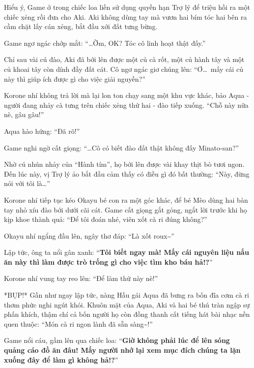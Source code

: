 \documentclass[../main.tex]{subfiles}
\begin{document}
Hiểu ý, Game ở trong chiếc loa liền sử dụng quyền hạn Trợ lý để triệu hồi ra một chiếc xẻng rồi đưa cho Aki. Aki không dùng tay mà vươn hai bím tóc hai bên ra cầm chặt lấy cán xẻng, bắt đầu xới đất tưng bừng.


Game ngơ ngác chớp mắt: ``\dots Ờm, OK? Tóc cô linh hoạt thật đấy.''

Chỉ sau vài cú đào, Aki đã bới lên được một củ cà rốt, một củ hành tây và một củ khoai tây còn dính đầy đất cát. Cô ngơ ngác giơ chúng lên: ``Ơ\dots\ mấy cái củ này thì giúp ích được gì cho việc giải nguyền?''

Korone nhí không trả lời mà lại lon ton chạy sang một khu vực khác, bảo Aqua - người đang nhảy cà tưng trên chiếc xẻng thứ hai - đào tiếp xuống. ``Chỗ này nữa nè, gâu gâu!''

Aqua hào hứng: ``Đã rõ!''


Game nghi ngờ cất giọng: ``\dots Cô có biết đào đất thật không đấy Minato-san?''

Nhờ cú nhún nhảy của ``Hành tím'', họ bới lên được vài khay thịt bò tươi ngon. Đến lúc này, vị Trợ lý ảo bắt đầu cảm thấy có điều gì đó bất thường: ``Này, đừng nói với tôi là\dots''

Korone nhí tiếp tục kéo Okayu bé con ra một góc khác, để bé Mèo dùng hai bàn tay nhỏ xíu đào bới dưới cãi cát. Game cất giọng gắt gỏng, ngắt lời trước khi họ kịp khoe thành quả: ``Để tôi đoán nhé, viên xốt cà ri đúng không?''


Okayu nhí ngẩng đầu lên, ngây thơ đáp: ``Là xốt roux\~{}''

Lập tức, ông ta nổi gân xanh: ``\textbf{Tôi biết ngay mà! Mấy cái nguyên liệu nấu ăn này thì làm được trò trống gì cho việc tìm kho báu hả!?}''

Korone nhí vung tay reo lên: ``Để làm thứ này nè!''

*BỤP!* Gần như ngay lập tức, nàng Hầu gái Aqua đã bưng ra bốn đĩa cơm cà ri thơm phức nghi ngút khói. Khuôn mặt của Aqua, Aki và hai bé thú tràn ngập sự phấn khích, thậm chí cả bốn người họ còn đồng thanh cất tiếng hát bài nhạc nền quen thuộc: ``Món cà ri ngon lành đã sẵn sàng\~{}!''


Game nổi cáu, gầm lên qua chiếc loa: ``\textbf{Giờ không phải lúc để lên sóng quảng cáo đồ ăn đâu! Mấy người nhớ lại xem mục đích chúng ta lặn xuống đây để làm gì không hả!?}''
\end{document}
